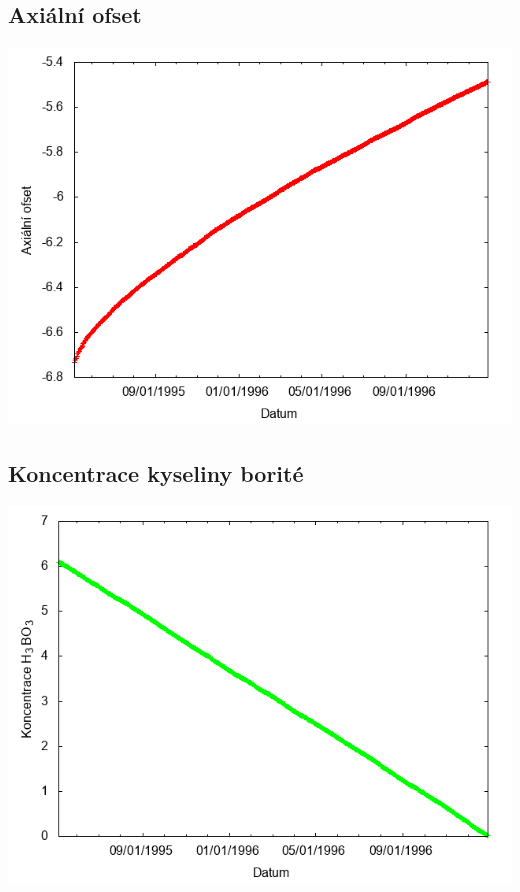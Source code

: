 \documentclass[a4paper,twoside,11pt]{article}
\begin{document}
\subsection*{Axiální ofset}
\begin{center}
\includegraphics[width=.8\textwidth]{graphs/CandyMountain_02_ao.png}
\end{center}

\subsection*{Koncentrace kyseliny borité}
\begin{center}
\includegraphics[width=.8\textwidth]{graphs/CandyMountain_02_bc.png}
\end{center}
\end{document}
